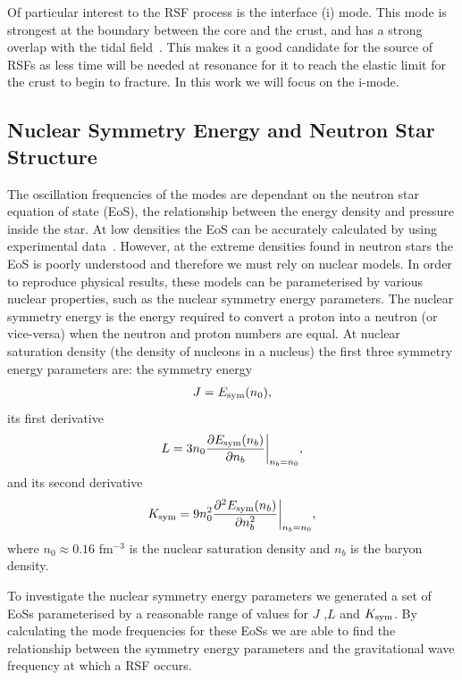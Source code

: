 \documentclass[fleqn,usenatbib]{mnras}
\begin{document}
\hspace{\parindent}Of particular interest to the RSF process is the interface (i) mode. This mode is strongest at the boundary between the core and the crust, and has a strong overlap with the tidal field~\cite{tsang2012resonant}. This makes it a good candidate for the source of RSFs as less time will be needed at resonance for it to reach the elastic limit for the crust to begin to fracture. In this work we will focus on the i-mode.








\subsection{Nuclear Symmetry Energy and Neutron Star Structure}
\hspace{\parindent}The oscillation frequencies of the modes are dependant on the neutron star equation of state (EoS), the relationship between the energy density and pressure inside the star. At low densities the EoS can be accurately calculated by using experimental data~\cite{baym1971ground}. However, at the extreme densities found in neutron stars the EoS is poorly understood and therefore we must rely on nuclear models. In order to reproduce physical results, these models can be parameterised by various nuclear properties, such as the nuclear symmetry energy parameters. The nuclear symmetry energy is the energy required to convert a proton into a neutron (or vice-versa) when the neutron and proton numbers are equal. At nuclear saturation density (the density of nucleons in a nucleus) the first three symmetry energy parameters are: the symmetry energy
\begin{align}
J=E_{\rm sym}(n_0),    
\label{eq:sym_J}
\end{align}
\noindent its first derivative 
\begin{align}
L=3n_0\frac{\partial E_{\rm sym}(n_b)}{\partial n_b}\biggr\rvert_{n_b=n_0},  
\label{eq:sym_L}
\end{align}
\noindent and its second derivative
\begin{align}
K_{\rm sym}=9n_0^2\frac{\partial^2 E_{\rm sym}(n_b)}{\partial n_b^2}\biggr\rvert_{n_b=n_0},
\label{eq:sym_K}
\end{align}
\noindent where $n_0\approx 0.16$ fm$^{-3}$ is the nuclear saturation density and $n_b$ is the baryon density.

\hspace{\parindent}To investigate the nuclear symmetry energy parameters we generated a set of EoSs parameterised by a reasonable range of values for $J$ ,$L$ and $K_{\rm sym}$. By calculating the mode frequencies for these EoSs we are able to find the relationship between the symmetry energy parameters and the gravitational wave frequency at which a RSF occurs.
\end{document}
